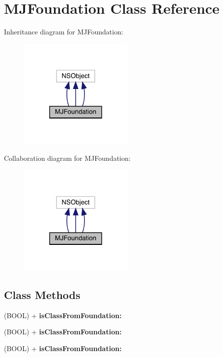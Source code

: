 \hypertarget{interface_m_j_foundation}{}\section{M\+J\+Foundation Class Reference}
\label{interface_m_j_foundation}


Inheritance diagram for M\+J\+Foundation\+:\nopagebreak
\begin{figure}[H]
\begin{center}
\leavevmode
\includegraphics[width=159pt]{interface_m_j_foundation__inherit__graph}
\end{center}
\end{figure}


Collaboration diagram for M\+J\+Foundation\+:\nopagebreak
\begin{figure}[H]
\begin{center}
\leavevmode
\includegraphics[width=159pt]{interface_m_j_foundation__coll__graph}
\end{center}
\end{figure}
\subsection*{Class Methods}
\begin{DoxyCompactItemize}
\item 
\mbox{\label{interface_m_j_foundation_a5b31c27b89d2f9db29a6a310cc5eb73e}} 
(B\+O\+OL) + {\bfseries is\+Class\+From\+Foundation\+:}
\item 
\mbox{\label{interface_m_j_foundation_a5b31c27b89d2f9db29a6a310cc5eb73e}} 
(B\+O\+OL) + {\bfseries is\+Class\+From\+Foundation\+:}
\item 
\mbox{\label{interface_m_j_foundation_a5b31c27b89d2f9db29a6a310cc5eb73e}} 
(B\+O\+OL) + {\bfseries is\+Class\+From\+Foundation\+:}
\end{DoxyCompactItemize}



